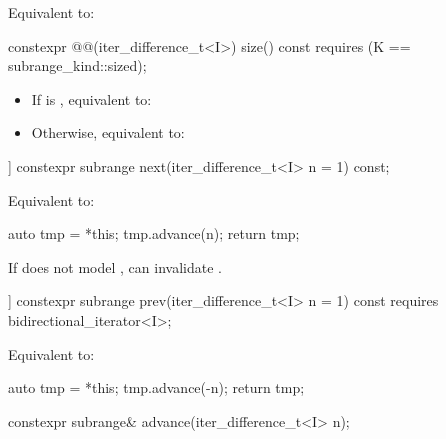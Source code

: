 \begin{itemdescr}
\pnum
\effects
Equivalent to: 
\end{itemdescr}

%
\begin{itemdecl}
constexpr @@(iter_difference_t<I>) size() const
  requires (K == subrange_kind::sized);
\end{itemdecl}

\begin{itemdescr}
\pnum
\effects
\begin{itemize}
\item If  is , equivalent to: 
\item Otherwise, equivalent to: 
\end{itemize}
\end{itemdescr}

%
\begin{itemdecl}
[[nodiscard]] constexpr subrange next(iter_difference_t<I> n = 1) const;
\end{itemdecl}

\begin{itemdescr}
\pnum
\effects
Equivalent to:
\begin{codeblock}
auto tmp = *this;
tmp.advance(n);
return tmp;
\end{codeblock}

\pnum
\begin{note}
If  does not model , 
can invalidate .
\end{note}
\end{itemdescr}

%
\begin{itemdecl}
[[nodiscard]] constexpr subrange prev(iter_difference_t<I> n = 1) const
  requires bidirectional_iterator<I>;
\end{itemdecl}

\begin{itemdescr}
\pnum
\effects
Equivalent to:
\begin{codeblock}
auto tmp = *this;
tmp.advance(-n);
return tmp;
\end{codeblock}
\end{itemdescr}

%
\begin{itemdecl}
constexpr subrange& advance(iter_difference_t<I> n);
\end{itemdecl}


